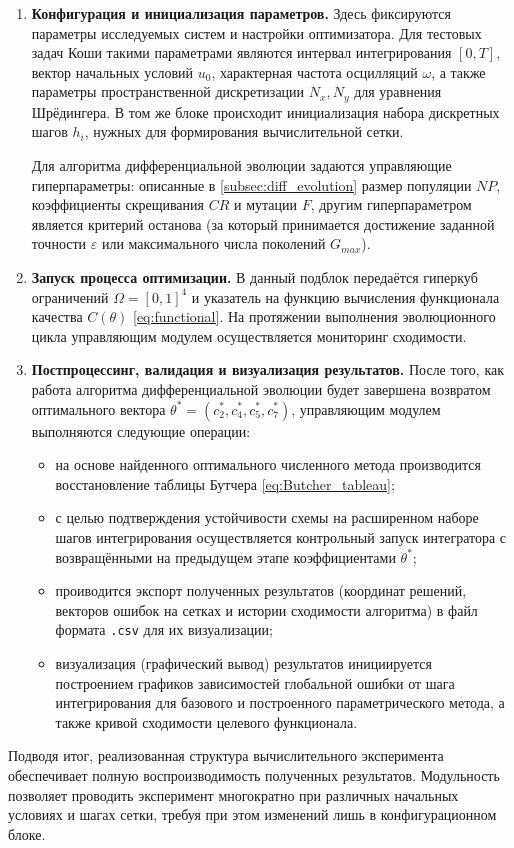 \begin{enumerate}
	\item \textbf{Конфигурация и инициализация параметров.} Здесь фиксируются параметры исследуемых систем и настройки оптимизатора. Для тестовых задач Коши такими параметрами являются интервал интегрирования $[0, T]$, вектор начальных условий $u_0$, характерная частота осцилляций $\omega$, а также параметры пространственной дискретизации $N_x, N_y$ для уравнения Шрёдингера. В том же блоке происходит инициализация набора дискретных шагов $h_i$, нужных для формирования вычислительной сетки.
	
	Для алгоритма дифференциальной эволюции задаются управляющие гиперпараметры: описанные в \ref{subsec:diff_evolution} размер популяции $NP$, коэффициенты скрещивания $CR$ и мутации $F$, другим гиперпараметром является критерий останова (за который принимается достижение заданной точности $\varepsilon$ или максимального числа поколений $G_{max}$).
	\item \textbf{Запуск процесса оптимизации.} В данный подблок передаётся гиперкуб ограничений $\Omega = [0, 1]^4$ и указатель на функцию вычисления функционала качества $C(\theta)$ \eqref{eq:functional}. На протяжении выполнения эволюционного цикла управляющим модулем осуществляется мониторинг сходимости.
	\item \textbf{Постпроцессинг, валидация и визуализация результатов.} После того, как работа алгоритма дифференциальной эволюции будет завершена возвратом оптимального вектора $\theta^* = (c_2^*, c_4^*, c_5^*, c_7^*)$, управляющим модулем выполняются следующие операции:
	\begin{itemize}
		\item на основе найденного оптимального численного метода производится восстановление таблицы Бутчера \eqref{eq:Butcher_tableau};
		\item с целью подтверждения устойчивости схемы на расширенном наборе шагов интегрирования осуществляется контрольный запуск интегратора с возвращёнными на предыдущем этапе коэффициентами $\theta^*$;
		\item проиводится экспорт полученных результатов (координат решений, векторов ошибок на сетках и истории сходимости алгоритма) в файл формата \texttt{.csv} для их визуализации;
		\item визуализация (графический вывод) результатов инициируется построением графиков зависимостей глобальной ошибки от шага интегрирования для базового и построенного параметрического метода, а также кривой сходимости целевого функционала.
	\end{itemize}
\end{enumerate}

Подводя итог, реализованная структура вычислительного эксперимента обеспечивает полную воспроизводимость полученных результатов. Модульность позволяет проводить эксперимент многократно при различных начальных условиях и шагах сетки, требуя при этом изменений лишь в конфигурационном блоке.